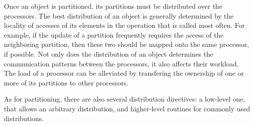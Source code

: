 \documentclass{article}
\begin{document}
Once an object is partitioned, its partitions must be distributed over
the processors. The best distribution of an object is generally
determined by the locality of accesses of its elements in the
operation that is called most often. For example, if the update of a
partition frequently requires the access of the neighboring partition,
then these two should be mapped onto the same processor, if
possible. Not only does the distribution of an object determines the
communication patterns between the processors, it also affects their
workload. The load of a processor can be alleviated by transfering the
ownership of one or more of its partitions to other processors.

As for partitioning, there are also several distribution directives: a
low-level one, that allows an arbitrary distribution, and higher-level
routines for commonly used distributions.
\end{document}
